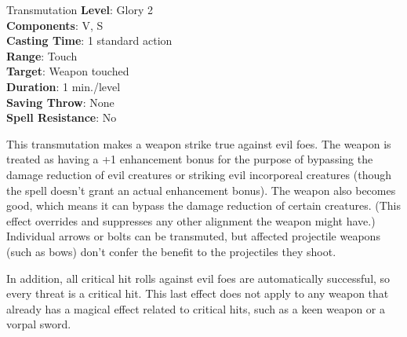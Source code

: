 {Transmutation}
{
	\textbf{Level}: Glory 2\\
	\textbf{Components}: V, S\\
	\textbf{Casting Time}: 1 standard action\\
	\textbf{Range}: Touch\\
	\textbf{Target}: Weapon touched\\
	\textbf{Duration}: 1 min./level\\
	\textbf{Saving Throw}: None\\
	\textbf{Spell Resistance}: No\\
}
{
	This transmutation makes a weapon strike true against evil foes. The weapon is treated as having a +1 enhancement bonus for the purpose of bypassing the damage reduction of evil creatures or striking evil incorporeal creatures (though the spell doesn't grant an actual enhancement bonus). The weapon also becomes good, which means it can bypass the damage reduction of certain creatures. (This effect overrides and suppresses any other alignment the weapon might have.) Individual arrows or bolts can be transmuted, but affected projectile weapons (such as bows) don't confer the benefit to the projectiles they shoot.

	In addition, all critical hit rolls against evil foes are automatically successful, so every threat is a critical hit. This last effect does not apply to any weapon that already has a magical effect related to critical hits, such as a keen weapon or a vorpal sword.
}